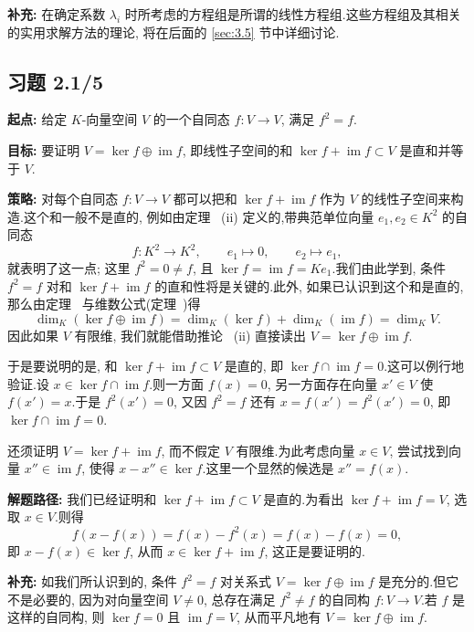 \noindent\textbf{补充:} 在确定系数 $\lambda_i$ 时所考虑的方程组是所谓的线性方程组.这些方程组及其相关的实用求解方法的理论, 将在后面的 \ref{sec:3.5} 节中详细讨论.

\subsection*{习题 2.1/5}

\noindent\textbf{起点:} 给定 $K$-向量空间 $V$ 的一个自同态 $f \colon V \longrightarrow V$, 满足 $f^2 = f$.

\noindent\textbf{目标:} 要证明 $V = \ker f \oplus \operatorname{im} f$, 即线性子空间的和 $\ker f + \operatorname{im} f \subset V$ 是直和并等于 $V$.

\noindent\textbf{策略:} 对每个自同态 $f \colon V \longrightarrow V$ 都可以把和 $\ker f + \operatorname{im} f$ 作为 $V$ 的线性子空间来构造.这个和一般不是直的, 例如由定理~ (ii) 定义的,带典范单位向量 $e_1, e_2 \in K^2$ 的自同态
\[
f \colon K^2 \longrightarrow K^2, \qquad e_1 \longmapsto 0, \qquad e_2 \longmapsto e_1,
\]
就表明了这一点; 这里 $f^2 = 0 \neq f$, 且 $\ker f = \operatorname{im} f = K e_1$.我们由此学到, 条件 $f^2 = f$ 对和 $\ker f + \operatorname{im} f$ 的直和性将是关键的.此外, 如果已认识到这个和是直的, 那么由定理~ 与维数公式(定理~)得
\[
\dim_K(\ker f \oplus \operatorname{im} f) = \dim_K(\ker f) + \dim_K(\operatorname{im} f) = \dim_K V\text{.}
\]
因此如果 $V$ 有限维, 我们就能借助推论~ (ii) 直接读出 $V = \ker f \oplus \operatorname{im} f$.

于是要说明的是, 和 $\ker f + \operatorname{im} f \subset V$ 是直的, 即 $\ker f \cap \operatorname{im} f = 0$.这可以例行地验证.设 $x \in \ker f \cap \operatorname{im} f$.则一方面 $f(x) = 0$, 另一方面存在向量 $x' \in V$ 使 $f(x') = x$.于是 $f^2(x') = 0$, 又因 $f^2 = f$ 还有 $x = f(x') = f^2(x') = 0$, 即 $\ker f \cap \operatorname{im} f = 0$.

还须证明 $V = \ker f + \operatorname{im} f$, 而不假定 $V$ 有限维.为此考虑向量 $x \in V$, 尝试找到向量 $x'' \in \operatorname{im} f$, 使得 $x - x'' \in \ker f$.这里一个显然的候选是 $x'' = f(x)$.

\noindent\textbf{解题路径:} 我们已经证明和 $\ker f + \operatorname{im} f \subset V$ 是直的.为看出 $\ker f + \operatorname{im} f = V$, 选取 $x \in V$.则得
\[
f(x - f(x)) = f(x) - f^2(x) = f(x) - f(x) = 0,
\]
即 $x - f(x) \in \ker f$, 从而 $x \in \ker f + \operatorname{im} f$, 这正是要证明的.

\noindent\textbf{补充:} 如我们所认识到的, 条件 $f^2 = f$ 对关系式 $V = \ker f \oplus \operatorname{im} f$ 是充分的.但它不是必要的, 因为对向量空间 $V \neq 0$, 总存在满足 $f^2 \neq f$ 的自同构 $f \colon V \longrightarrow V$.若 $f$ 是这样的自同构, 则 $\ker f = 0$ 且 $\operatorname{im} f = V$, 从而平凡地有 $V = \ker f \oplus \operatorname{im} f$.

